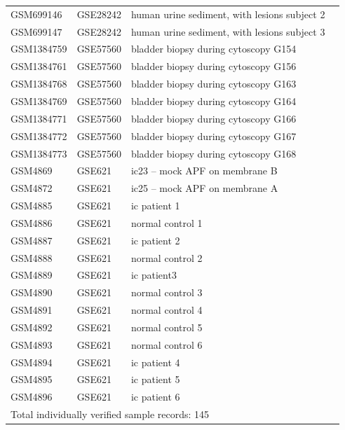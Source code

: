 \begin{longtable}{llp{}l}
GSM699146 & GSE28242 & human urine sediment, with lesions subject 2 &  \\
GSM699147 & GSE28242 & human urine sediment, with lesions subject 3 &  \\
GSM1384759 & GSE57560 & bladder biopsy during cytoscopy G154 &  \\
GSM1384761 & GSE57560 & bladder biopsy during cytoscopy G156 &  \\
GSM1384768 & GSE57560 & bladder biopsy during cytoscopy G163 &  \\
GSM1384769 & GSE57560 & bladder biopsy during cytoscopy G164 &  \\
GSM1384771 & GSE57560 & bladder biopsy during cytoscopy G166 &  \\
GSM1384772 & GSE57560 & bladder biopsy during cytoscopy G167 &  \\
GSM1384773 & GSE57560 & bladder biopsy during cytoscopy G168 &  \\
GSM4869 & GSE621 & ic23 -- mock APF on membrane B &  \\
GSM4872 & GSE621 & ic25 -- mock APF on membrane A &  \\
GSM4885 & GSE621 & ic patient 1 &  \\
GSM4886 & GSE621 & normal control 1 &  \\
GSM4887 & GSE621 & ic patient 2 &  \\
GSM4888 & GSE621 & normal control 2 &  \\
GSM4889 & GSE621 & ic patient3 &  \\
GSM4890 & GSE621 & normal control 3 &  \\
GSM4891 & GSE621 & normal control 4 &  \\
GSM4892 & GSE621 & normal control 5 &  \\
GSM4893 & GSE621 & normal control 6 &  \\
GSM4894 & GSE621 & ic patient 4 &  \\
GSM4895 & GSE621 & ic patient 5 &  \\
GSM4896 & GSE621 & ic patient 6 &  \\
\hline \multicolumn{4}{l}{Total individually verified sample records: 145} \\
\hline\hline\end{longtable}
